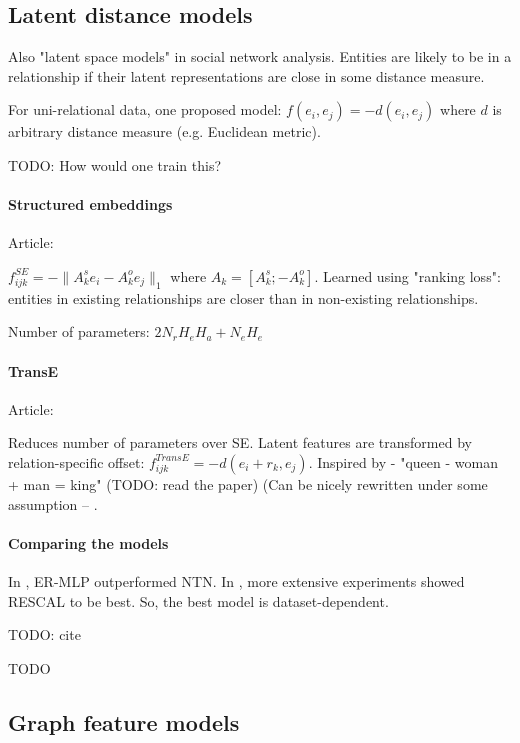 \subsection{Latent distance models}

Also "latent space models" in social network analysis. Entities are likely to be
in a relationship if their latent representations are close in some distance
measure.

For uni-relational data, one proposed model: $f(e_i,e_j)=-d(e_i,e_j)$ where $d$
is arbitrary distance measure (e.g. Euclidean metric).

TODO: How would one train this?

\paragraph{Structured embeddings}
\label{structured-embeddings}

Article: \cite{structured-embeddings}

$f_{ijk}^{SE}=-\|A_k^s e_i - A_k^o e_j\|_1$ where $A_k=[A_k^s; -A_k^o]$.
Learned using "ranking loss": entities in existing relationships are closer than
in non-existing relationships.

Number of parameters: $2N_r H_e H_a + N_e H_e$

\paragraph{TransE}
\label{transe}

Article: \cite{transe}

Reduces number of parameters over SE.
Latent features are transformed by relation-specific offset:
$f_{ijk}^{TransE}=-d(e_i+r_k,e_j)$.
Inspired by \cite{efficient-word-representation-estimation} - "queen - woman
+ man = king" (TODO: read the paper)
(Can be nicely rewritten under some assumption --
\cite{review-of-relational-ml-for-kgs}.

\paragraph{Comparing the models}

In \cite{knowledge-vault}, ER-MLP outperformed NTN.
In \cite{embedding-entities-and-relations}, more extensive experiments showed
RESCAL to be best.
So, the best model is dataset-dependent.

TODO: cite

TODO

\subsection{Graph feature models}

